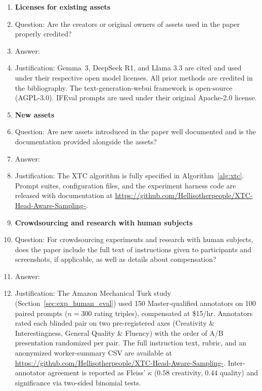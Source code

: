 \documentclass{article}
\newcommand{\xtc}{\textsc{XTC}}
\begin{document}
\begin{enumerate}
\item {\bf Licenses for existing assets}
    \item[] Question: Are the creators or original owners of assets used in the paper properly credited?
    \item[] Answer: \answerYes{}
    \item[] Justification: Gemma~3, DeepSeek R1, and Llama 3.3 are cited and used under their respective open model licenses. All prior methods are credited in the bibliography. The text-generation-webui framework is open-source (AGPL-3.0). IFEval prompts \citep{zhou2023instructionfollowing} are used under their original Apache-2.0 license.

\item {\bf New assets}
    \item[] Question: Are new assets introduced in the paper well documented and is the documentation provided alongside the assets?
    \item[] Answer: \answerYes{}
    \item[] Justification: The \xtc{} algorithm is fully specified in Algorithm~\ref{alg:xtc}. Prompt suites, configuration files, and the experiment harness code are released with documentation at \url{https://github.com/Hellisotherpeople/XTC-Head-Aware-Sampling-}.

\item {\bf Crowdsourcing and research with human subjects}
    \item[] Question: For crowdsourcing experiments and research with human subjects, does the paper include the full text of instructions given to participants and screenshots, if applicable, as well as details about compensation?
    \item[] Answer: \answerYes{}
    \item[] Justification: The Amazon Mechanical Turk study (Section~\ref{sec:exp_human_eval}) used 150 Master-qualified annotators on 100 paired prompts ($n{=}300$ rating triples), compensated at \$15/hr. Annotators rated each blinded pair on two pre-registered axes (Creativity \& Interestingness, General Quality \& Fluency) with the order of A/B presentation randomized per pair. The full instruction text, rubric, and an anonymized worker-summary CSV are available at \url{https://github.com/Hellisotherpeople/XTC-Head-Aware-Sampling-}. Inter-annotator agreement is reported as Fleiss' $\kappa$ ($0.58$ creativity, $0.44$ quality) and significance via two-sided binomial tests.


\end{enumerate}
\end{document}
